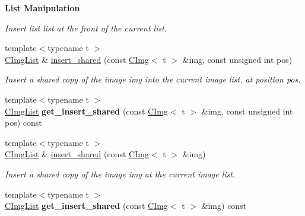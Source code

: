 \begin{Indent}{\bf List Manipulation}
\begin{DoxyCompactItemize}
\begin{DoxyCompactList}\small\item\em Insert list {\ttfamily list} at the front of the current list. \item\end{DoxyCompactList}\item 
\hypertarget{structcimg__library_1_1_c_img_list_abdf1438800e16255bfa9866c74287bc8}{
{\footnotesize template$<$typename t $>$ }\\\hyperlink{structcimg__library_1_1_c_img_list}{CImgList} \& \hyperlink{structcimg__library_1_1_c_img_list_abdf1438800e16255bfa9866c74287bc8}{insert\_\-shared} (const \hyperlink{structcimg__library_1_1_c_img}{CImg}$<$ t $>$ \&img, const unsigned int pos)}
\label{structcimg__library_1_1_c_img_list_abdf1438800e16255bfa9866c74287bc8}

\begin{DoxyCompactList}\small\item\em Insert a shared copy of the image {\ttfamily img} into the current image list, at position {\ttfamily pos}. \item\end{DoxyCompactList}\item 
\hypertarget{structcimg__library_1_1_c_img_list_a194af9ea2368be1dc8f80f1435d3eaa8}{
{\footnotesize template$<$typename t $>$ }\\\hyperlink{structcimg__library_1_1_c_img_list}{CImgList} {\bfseries get\_\-insert\_\-shared} (const \hyperlink{structcimg__library_1_1_c_img}{CImg}$<$ t $>$ \&img, const unsigned int pos) const }
\label{structcimg__library_1_1_c_img_list_a194af9ea2368be1dc8f80f1435d3eaa8}

\item 
\hypertarget{structcimg__library_1_1_c_img_list_a8bea473da0f3de777e3b7bc05d1f03f4}{
{\footnotesize template$<$typename t $>$ }\\\hyperlink{structcimg__library_1_1_c_img_list}{CImgList} \& \hyperlink{structcimg__library_1_1_c_img_list_a8bea473da0f3de777e3b7bc05d1f03f4}{insert\_\-shared} (const \hyperlink{structcimg__library_1_1_c_img}{CImg}$<$ t $>$ \&img)}
\label{structcimg__library_1_1_c_img_list_a8bea473da0f3de777e3b7bc05d1f03f4}

\begin{DoxyCompactList}\small\item\em Insert a shared copy of the image {\ttfamily img} at the current image list. \item\end{DoxyCompactList}\item 
\hypertarget{structcimg__library_1_1_c_img_list_a134791fc1a6e80f6fd67148106be0798}{
{\footnotesize template$<$typename t $>$ }\\\hyperlink{structcimg__library_1_1_c_img_list}{CImgList} {\bfseries get\_\-insert\_\-shared} (const \hyperlink{structcimg__library_1_1_c_img}{CImg}$<$ t $>$ \&img) const }
\label{structcimg__library_1_1_c_img_list_a134791fc1a6e80f6fd67148106be0798}


\end{DoxyCompactItemize}
\end{Indent}
